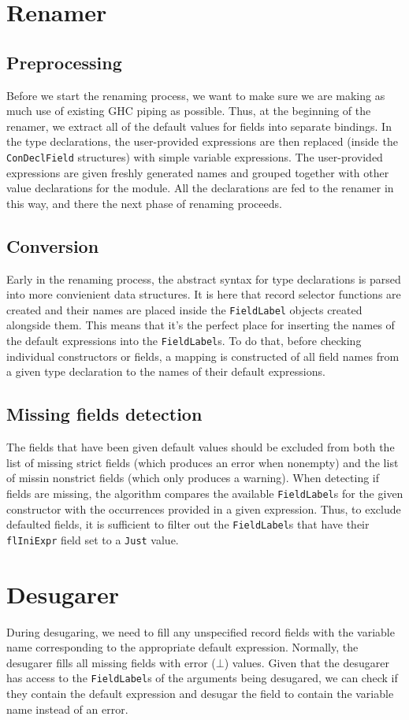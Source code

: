\documentclass[en]{pracamgr}
\begin{document}
\section{Renamer}
\subsection{Preprocessing}
Before we start the renaming process, we want to make sure we are making as much use of existing GHC piping as possible.
Thus, at the beginning of the renamer, we extract all of the default values for fields into separate bindings.
In the type declarations, the user-provided expressions are then replaced (inside the \texttt{ConDeclField} structures) with simple variable expressions.
The user-provided expressions are given freshly generated names and grouped together with other value declarations for the module.
All the declarations are fed to the renamer in this way, and there the next phase of renaming proceeds.
\subsection{Conversion}
Early in the renaming process, the abstract syntax for type declarations is parsed into more convienient data structures.
It is here that record selector functions are created and their names are placed inside the \texttt{FieldLabel} objects created alongside them.
This means that it's the perfect place for inserting the names of the default expressions into the \texttt{FieldLabel}s.
To do that, before checking individual constructors or fields, a mapping is constructed of all field names from a given type declaration to the names of their default expressions.
\subsection{Missing fields detection}
The fields that have been given default values should be excluded from both the list of missing strict fields (which produces an error when nonempty) and the list of missin nonstrict fields (which only produces a warning).
When detecting if fields are missing, the algorithm compares the available \texttt{FieldLabel}s for the given constructor with the occurrences provided in a given expression.
Thus, to exclude defaulted fields, it is sufficient to filter out the \texttt{FieldLabel}s that have their \texttt{flIniExpr} field set to a \texttt{Just} value.

\section{Desugarer}
During desugaring, we need to fill any unspecified record fields with the variable name corresponding to the appropriate default expression.
Normally, the desugarer fills all missing fields with error ($\bot$) values.
Given that the desugarer has access to the \texttt{FieldLabel}s of the arguments being desugared, we can check if they contain the default expression and desugar the field to contain the variable name instead of an error.
\end{document}
